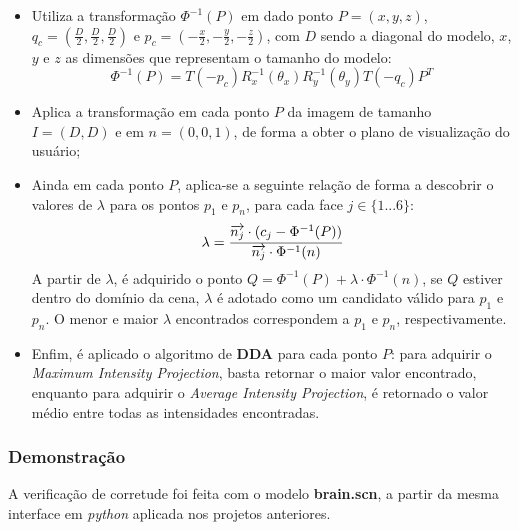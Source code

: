             \begin{itemize}
                \item Utiliza a transformação \textbf{$\Phi^{-1}(P)$} em dado ponto \textbf{$P = (x, y, z)$}, 
                $q_c = (\frac{D}{2}, \frac{D}{2}, \frac{D}{2})$ e $p_c = (-\frac{x}{2}, -\frac{y}{2}, -\frac{z}{2})$, com $D$ sendo a diagonal do modelo, $x$, $y$ e $z$ as dimensões que representam o tamanho do modelo: \\
                \begin{equation}
                    \Phi^{-1}(P) = T(-p_c)R_x^{-1}(\theta_x)R_y^{-1}(\theta_y)T(-q_c)P^{T}
                \end{equation}
                \item Aplica a transformação em cada ponto $P$ da imagem de tamanho $I = (D, D)$ e em $n = (0, 0, 1)$, de forma a obter o plano de visualização do usuário;
                \item Ainda em cada ponto $P$, aplica-se a seguinte relação de forma a descobrir o valores de $\lambda$ para os pontos $p_1$ e $p_n$, para cada face $j \in \{1 ... 6\}$:
                \begin{equation}
                    \lambda = \cfrac{\overrightarrow{n_j} \cdot (c_j - \Phi^{-1}(P))}{\overrightarrow{n_j} \cdot \Phi^{-1}(n)}
                \end{equation}
                A partir de $\lambda$, é adquirido o ponto $Q = \Phi^{-1}(P) + \lambda \cdot \Phi^{-1}(n)$, se $Q$ estiver dentro do domínio da cena, $\lambda$ é adotado como um candidato válido para $p_1$ e $p_n$.
                O menor e maior $\lambda$ encontrados correspondem a $p_1$ e $p_n$, respectivamente.
                \item Enfim, é aplicado o algoritmo de \textbf{DDA} para cada ponto $P$: para adquirir o \textit{Maximum Intensity Projection}, basta retornar o maior valor encontrado, enquanto para adquirir o \textit{Average Intensity Projection}, é retornado o valor médio entre todas as intensidades encontradas.
            \end{itemize}

        \subsubsection{Demonstração}
            A verificação de corretude foi feita com o modelo \textbf{brain.scn}, a partir da mesma interface em \textit{python} aplicada nos projetos anteriores.

